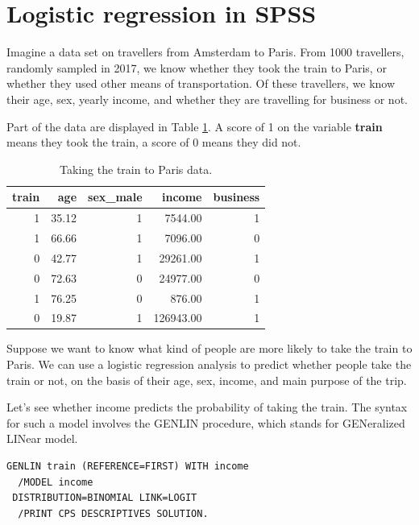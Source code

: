 \documentclass[]{book}\usepackage[]{graphicx}\usepackage[]{color}
\begin{document}
\section{Logistic regression in SPSS}

Imagine a data set on travellers from Amsterdam to Paris. From 1000 travellers, randomly sampled in 2017, we know whether they took the train to Paris, or whether they used other means of transportation. Of these travellers, we know their age, sex, yearly income, and whether they are travelling for business or not.

Part of the data are displayed in Table \ref{tab:gen_12}. A score of 1 on the variable \textbf{train} means they took the train, a score of 0 means they did not.



\begin{table}[ht]
\centering
\caption{Taking the train to Paris data.} 
\label{tab:gen_12}
\begin{tabular}{rrrrr}
  \hline
train & age & sex\_male & income & business \\ 
  \hline
  1 & 35.12 &   1 & 7544.00 &   1 \\ 
    1 & 66.66 &   1 & 7096.00 &   0 \\ 
    0 & 42.77 &   1 & 29261.00 &   1 \\ 
    0 & 72.63 &   0 & 24977.00 &   0 \\ 
    1 & 76.25 &   0 & 876.00 &   1 \\ 
    0 & 19.87 &   1 & 126943.00 &   1 \\ 
   \hline
\end{tabular}
\end{table}



Suppose we want to know what kind of people are more likely to take the train to Paris. We can use a logistic regression analysis to predict whether people take the train or not, on the basis of their age, sex, income, and main purpose of the trip.

Let's see whether income predicts the probability of taking the train. The syntax for such a model involves the GENLIN procedure, which stands for GENeralized LINear model.



\begin{verbatim}
GENLIN train (REFERENCE=FIRST) WITH income
  /MODEL income
 DISTRIBUTION=BINOMIAL LINK=LOGIT
  /PRINT CPS DESCRIPTIVES SOLUTION.
\end{verbatim}
\end{document}
